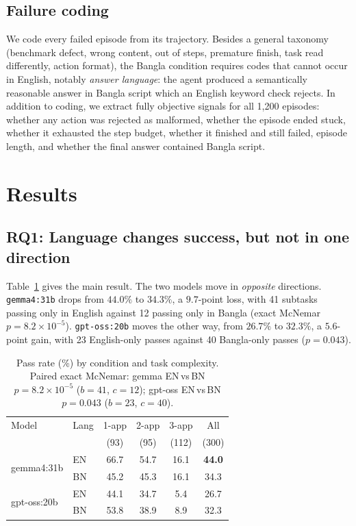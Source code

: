 \documentclass[11pt]{article}
\newcommand{\dn}[1]{\textcolor{red!70!black}{#1}}
\newcommand{\up}[1]{\textcolor{green!45!black}{#1}}
\begin{document}
\subsection{Failure coding}
We code every failed episode from its trajectory. Besides a general taxonomy (benchmark defect,
wrong content, out of steps, premature finish, task read differently, action format), the Bangla
condition requires codes that cannot occur in English, notably \emph{answer language}: the agent
produced a semantically reasonable answer in Bangla script which an English keyword check
rejects. In addition to coding, we extract fully objective signals for all 1{,}200 episodes:
whether any action was rejected as malformed, whether the episode ended stuck, whether it
exhausted the step budget, whether it finished and still failed, episode length, and whether the
final answer contained Bangla script.

\section{Results}

\subsection{RQ1: Language changes success, but not in one direction}

Table~\ref{tab:main} gives the main result. The two models move in \emph{opposite} directions.
\texttt{gemma4:31b} drops from $44.0\%$ to $34.3\%$, a $9.7$-point loss, with 41 subtasks
passing only in English against 12 passing only in Bangla (exact McNemar $p=8.2\times10^{-5}$).
\texttt{gpt-oss:20b} moves the other way, from $26.7\%$ to $32.3\%$, a $5.6$-point gain, with 23
English-only passes against 40 Bangla-only passes ($p=0.043$).

\begin{table}[t]
\centering\small
\begin{tabular}{llcccc}
\toprule
Model & Lang & 1-app & 2-app & 3-app & All \\
 & & (93) & (95) & (112) & (300) \\
\midrule
\multirow{2}{*}{gemma4:31b}
 & EN & 66.7 & 54.7 & 16.1 & \textbf{44.0} \\
 & BN & 45.2 & 45.3 & 16.1 & \dn{34.3} \\
\midrule
\multirow{2}{*}{gpt-oss:20b}
 & EN & 44.1 & 34.7 & 5.4 & 26.7 \\
 & BN & 53.8 & 38.9 & 8.9 & \up{32.3} \\
\bottomrule
\end{tabular}
\caption{Pass rate (\%) by condition and task complexity. Paired exact McNemar:
gemma EN\,vs\,BN $p=8.2{\times}10^{-5}$ ($b{=}41$, $c{=}12$);
gpt-oss EN\,vs\,BN $p=0.043$ ($b{=}23$, $c{=}40$).}
\label{tab:main}
\end{table}
\end{document}
